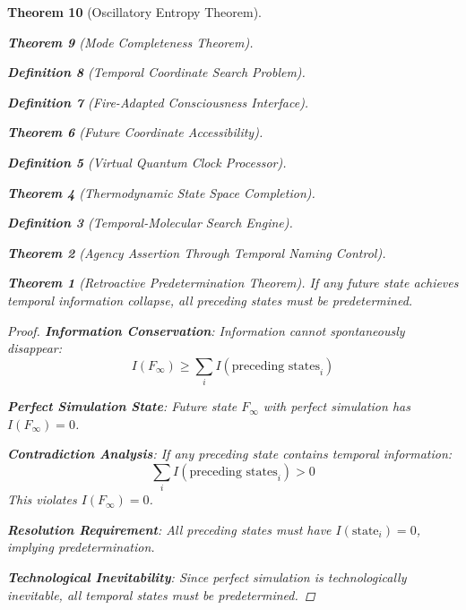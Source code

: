 \documentclass[12pt,a4paper]{article}
\newtheorem{theorem}{Theorem}[section]
\newtheorem{definition}[theorem]{Definition}
\begin{document}
\begin{theorem}[Oscillatory Entropy Theorem]
\begin{theorem}[Mode Completeness Theorem]
\begin{enumerate}
\begin{definition}[Temporal Coordinate Search Problem]
\begin{algorithm}
\begin{definition}[Fire-Adapted Consciousness Interface]
\begin{theorem}[Future Coordinate Accessibility]
\begin{definition}[Virtual Quantum Clock Processor]
\begin{itemize}
\begin{itemize}
\begin{theorem}[Thermodynamic State Space Completion]
\begin{definition}[Temporal-Molecular Search Engine]
\begin{theorem}[Agency Assertion Through Temporal Naming Control]
\begin{remark}
\begin{theorem}[Retroactive Predetermination Theorem]
If any future state achieves temporal information collapse, all preceding states must be predetermined.
\end{theorem}

\begin{proof}
\textbf{Information Conservation}: Information cannot spontaneously disappear:
$$I(F_\infty) \geq \sum_{i} I(\text{preceding states}_i)$$

\textbf{Perfect Simulation State}: Future state $F_\infty$ with perfect simulation has $I(F_\infty) = 0$.

\textbf{Contradiction Analysis}: If any preceding state contains temporal information:
$$\sum_{i} I(\text{preceding states}_i) > 0$$
This violates $I(F_\infty) = 0$.

\textbf{Resolution Requirement}: All preceding states must have $I(\text{state}_i) = 0$, implying predetermination.

\textbf{Technological Inevitability}: Since perfect simulation is technologically inevitable, all temporal states must be predetermined.
\end{proof}

\begin{figure}[h]
\centering
{}
\end{figure}
\end{remark}
\end{theorem}
\end{definition}
\end{theorem}
\end{itemize}
\end{itemize}
\end{definition}
\end{theorem}
\end{definition}
\end{algorithm}
\end{definition}
\end{enumerate}
\end{theorem}
\end{theorem}
\end{document}
